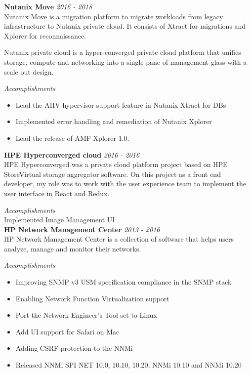 \documentclass[line,margin]{res}
\begin{document}
\begin{resume}
{\bf Nutanix Move} \hfill {\it{2016 - 2018}}\\

Nutanix Move is a migration platform to migrate workloads from legacy infrastructure to Nutanix private cloud. It consists of Xtract for migrations and Xplorer for reconnaissance.

Nutanix private cloud is a hyper-converged private cloud platform that unifies storage, compute and networking into a single pane of management glass with a scale out design. 

{\it{Accomplishments}}\\
\begin{itemize}
\item Lead the AHV hypervisor support feature in Nutanix Xtract for DBs
\item Implemented error handling and remediation of Nutanix Xplorer
\item Lead the release of AMF Xplorer 1.0.
\end{itemize}


{\bf HPE Hyperconverged cloud} \hfill {\it{2016 - 2016}}\\

HPE Hyperconverged was a private cloud platform project based on HPE StoreVirtual storage aggregator software. On this project as a front end developer, my role was to work with the user experience team to implement the user interface in React and Redux.

{\it{Accomplishments}}\\
Implemented Image Management UI\\

{\bf HP Network Management Center} \hfill {\it{2013 - 2016}}\\
HP Network Management Center is a collection of software that helps users analyze, manage and monitor their networks.

{\it{Accomplishments}}\\
\begin{itemize}
\item Improving SNMP v3 USM specification compliance in the SNMP stack
\item Enabling Network Function Virtualization support
\item Port the Network Engineer's Tool set to Linux
\item Add UI support for Safari on Mac
\item Adding CSRF protection to the NNMi
\item Released NNMi SPI NET 10.0, 10.10, 10.20, NNMi 10.10 and NNMi 10.20
\end{itemize}



\end{resume}
\end{document}
